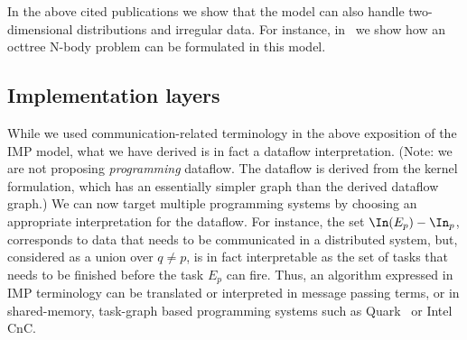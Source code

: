 In the above cited publications we show that the model can also
handle two-dimensional distributions and irregular data. For instance,
in~\cite{Eijkhout:2013:dataflowreport} we show how an octtree N-body problem
can be formulated in this model.

\subsection{Implementation layers}

While we used communication-related terminology in the above exposition
of the \ac{IMP} model, what we have derived is in fact a dataflow
interpretation. (Note: we are not proposing \emph{programming} dataflow. 
The dataflow is derived from the kernel formulation, which has an essentially 
simpler graph than the derived dataflow graph.)
We can now target multiple programming systems by choosing an appropriate interpretation
for the dataflow. For instance,
the set $\In(E_p)-\In_p$, corresponds to data that needs to be communicated 
in a distributed system, but,
considered as a union over
$q\not=p$, is in fact interpretable as the set of tasks that needs to
be finished before the task $E_p$ can fire. Thus, an algorithm
expressed in \ac{IMP} terminology can be translated or
interpreted in message passing terms, or in shared-memory, task-graph
based programming systems such as Quark~\cite{Yarkhan:quark-report} or
Intel CnC.


